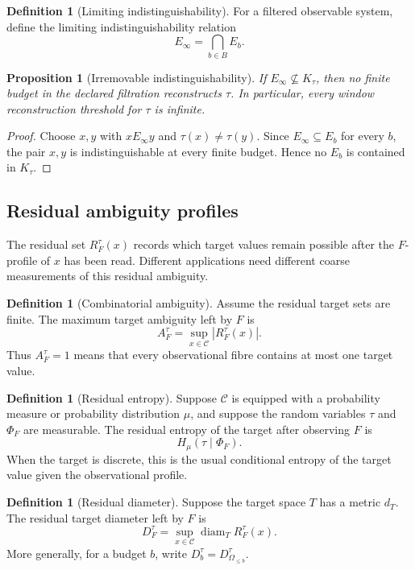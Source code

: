 \documentclass[11pt]{article}
\newtheorem{proposition}[theorem]{Proposition}
\theoremstyle{definition}
\newtheorem{definition}[theorem]{Definition}
\theoremstyle{remark}
\begin{document}
\begin{definition}[Limiting indistinguishability]
For a filtered observable system, define the limiting indistinguishability relation
\[
E_\infty=\bigcap_{b\in B}E_b.
\]
\end{definition}

\begin{proposition}[Irremovable indistinguishability]
If \(E_\infty\not\subseteq K_\tau\), then no finite budget in the declared filtration reconstructs \(\tau\).  In particular, every window reconstruction threshold for \(\tau\) is infinite.
\end{proposition}

\begin{proof}
Choose \(x,y\) with \(xE_\infty y\) and \(\tau(x)\neq\tau(y)\).  Since \(E_\infty\subseteq E_b\) for every \(b\), the pair \(x,y\) is indistinguishable at every finite budget.  Hence no \(E_b\) is contained in \(K_\tau\).
\end{proof}

\subsection{Residual ambiguity profiles}

The residual set \(R_F^\tau(x)\) records which target values remain possible after the \(F\)-profile of \(x\) has been read.  Different applications need different coarse measurements of this residual ambiguity.

\begin{definition}[Combinatorial ambiguity]
Assume the residual target sets are finite.  The maximum target ambiguity left by \(F\) is
\[
A_F^\tau
=
\sup_{x\in\mathcal C}|R_F^\tau(x)|.
\]
Thus \(A_F^\tau=1\) means that every observational fibre contains at most one target value.
\end{definition}

\begin{definition}[Residual entropy]
Suppose \(\mathcal C\) is equipped with a probability measure or probability distribution \(\mu\), and suppose the random variables \(\tau\) and \(\Phi_F\) are measurable.  The residual entropy of the target after observing \(F\) is
\[
H_\mu(\tau\mid \Phi_F).
\]
When the target is discrete, this is the usual conditional entropy of the target value given the observational profile.
\end{definition}

\begin{definition}[Residual diameter]
Suppose the target space \(T\) has a metric \(d_T\).  The residual target diameter left by \(F\) is
\[
D_F^\tau
=
\sup_{x\in\mathcal C}
\operatorname{diam}_T R_F^\tau(x).
\]
More generally, for a budget \(b\), write \(D_b^\tau=D_{\Omega_{\le b}}^\tau\).
\end{definition}
\end{document}
